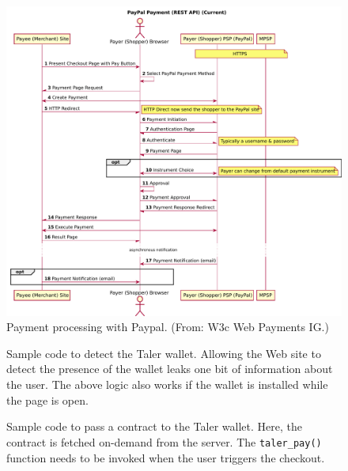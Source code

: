 \documentclass{IEEEtran}
\begin{document}
\begin{figure}
\includegraphics[width=\textwidth]{figs/paypal.pdf}
\caption{Payment processing with Paypal. (From: W3c Web Payments IG.)}
\label{fig:paypal}
\end{figure}


{}

\begin{figure}
 \lstset{language=JavaScript}
 
 \caption{Sample code to detect the Taler wallet. Allowing the
  Web site to detect the presence of the wallet leaks one bit
  of information about the user. The above logic also works
  if the wallet is installed while the page is open.}
  \label{listing:presence}
\end{figure}


\begin{figure}
 \lstset{language=JavaScript}
 
 \caption{Sample code to pass a contract to the Taler wallet.
          Here, the contract is fetched on-demand from the server.
          The {\tt taler\_pay()} function needs to be invoked
          when the user triggers the checkout.}
 \label{listing:contract}
\end{figure}
\end{document}
